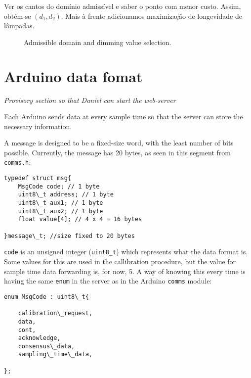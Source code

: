 \documentclass[english,palatino]{ist-report}
\newcommand{\ccode}[1]{\texttt{#1}}
\begin{document}
Ver os cantos do domínio admissível e saber o ponto com menor custo. Assim, obtém-se $(d_1,d_2)$. Mais à frente adicionamos maximização de longevidade de lâmpadas.
\begin{figure}[ht]
	\centering
	
	\caption{Admissible domain and dimming value selection.}
\end{figure}


\section{Arduino data fomat}

{\centering \textit{Provisory section so that Daniel can start the web-server}}

Each Arduino sends data at every sample time so that the server can store the necessary information. 

A message is designed to be a fixed-size word, with the least number of bits possible.
Currently, the message has 20 bytes, as seen in this segment from \texttt{comms.h}:
\begin{verbatim}
typedef struct msg{
    MsgCode code; // 1 byte
    uint8\_t address; // 1 byte
    uint8\_t aux1; // 1 byte
    uint8\_t aux2; // 1 byte
    float value[4]; // 4 x 4 = 16 bytes

}message\_t; //size fixed to 20 bytes
\end{verbatim}

\ccode{code} is an unsigned integer (\ccode{uint8\_t}) which represents what the data format is.
Some values for this are used in the callibration procedure, but the value for sample time data forwarding is, for now, 5.
A way of knowing this every time is having the same \ccode{enum} in the server as in the Arduino \texttt{comms} module:
\begin{verbatim}
enum MsgCode : uint8\_t{

    calibration\_request,
    data,
    cont,
    acknowledge,
    consensus\_data,
    sampling\_time\_data,

};
\end{verbatim}
\end{document}
